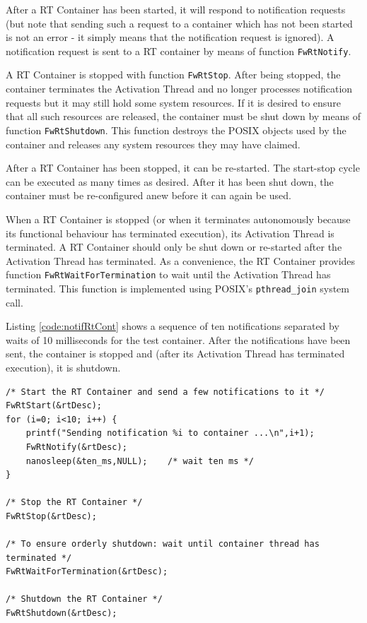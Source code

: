 \documentclass[a4paper,10pt]{article}
\begin{document}
After a RT Container has been started, it will respond to notification requests (but note that sending such a request to a container which has not been started is not an error - it simply means that the notification request is ignored). A notification request is sent to a RT container by means of function \texttt{FwRtNotify}. 

A RT Container is stopped with function \texttt{FwRtStop}. After being stopped, the container terminates the Activation Thread and no longer processes notification requests but it may still hold some system resources. If it is desired to ensure that all such resources are released, the container must be shut down by means of function \texttt{FwRtShutdown}. This function destroys the POSIX objects used by the container and releases any system resources they may have claimed.

After a RT Container has been stopped, it can be re-started. The start-stop cycle can be executed as many times as desired. After it has been shut down, the container must be re-configured anew before it can again be used.

When a RT Container is stopped (or when it terminates autonomously because its functional behaviour has terminated execution), its Activation Thread is terminated. A RT Container should only be shut down or re-started after the Activation Thread has terminated. As a convenience, the RT Container provides function \texttt{FwRtWaitForTermination} to wait until the Activation Thread has terminated. This function is implemented using POSIX's \texttt{pthread\_join} system call.

Listing \ref{code:notifRtCont} shows a sequence of ten notifications separated by waits of 10 milliseconds for the test container. After the notifications have been sent, the container is stopped and (after its Activation Thread has terminated execution), it is shutdown.

\begin{lstlisting}
/* Start the RT Container and send a few notifications to it */
FwRtStart(&rtDesc);
for (i=0; i<10; i++) {
	printf("Sending notification %i to container ...\n",i+1);
	FwRtNotify(&rtDesc);
	nanosleep(&ten_ms,NULL);	/* wait ten ms */
}

/* Stop the RT Container */
FwRtStop(&rtDesc);

/* To ensure orderly shutdown: wait until container thread has terminated */
FwRtWaitForTermination(&rtDesc);

/* Shutdown the RT Container */
FwRtShutdown(&rtDesc);
\end{lstlisting}
\end{document}
